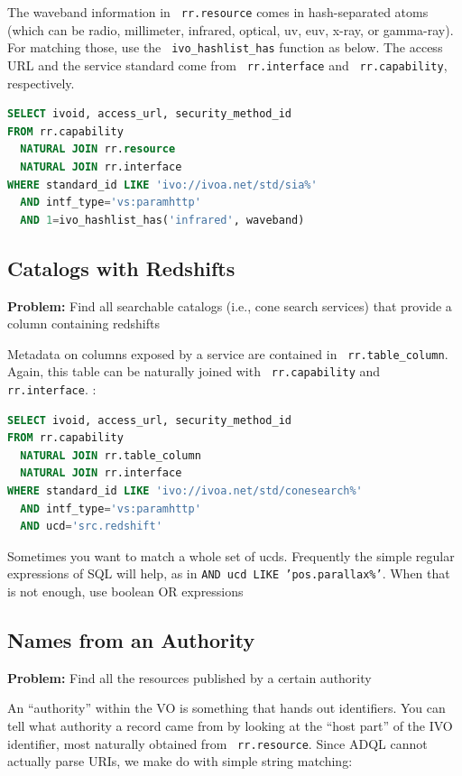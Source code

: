 \documentclass[11pt,a4paper]{ivoa}
\newcommand{\rtent}[1]{\texttt{\color{rtcolor} #1}}
\begin{document}
The waveband information in 
\rtent{rr.resource} 
comes in hash-separated atoms (which can be
radio, millimeter, infrared, optical, uv, euv, x-ray, or gamma-ray).
For matching those, use the \rtent{ivo\_hashlist\_has} function as
below.  The access URL and the service standard come from 
\rtent{rr.interface} and 
\rtent{rr.capability}, respectively.


\begin{lstlisting}[language=SQL,flexiblecolumns=true]
SELECT ivoid, access_url, security_method_id
FROM rr.capability 
  NATURAL JOIN rr.resource
  NATURAL JOIN rr.interface
WHERE standard_id LIKE 'ivo://ivoa.net/std/sia%'
  AND intf_type='vs:paramhttp'
  AND 1=ivo_hashlist_has('infrared', waveband)
\end{lstlisting}

\subsection{Catalogs with Redshifts}
\textbf{Problem:} Find all searchable catalogs (i.e., cone search
services) that provide a column containing redshifts

Metadata on columns exposed by a service are contained in 
\rtent{rr.table\_column}.  Again, this table can be
naturally joined with 
\rtent{rr.capability} and 
\rtent{rr.interface}.
:
\begin{lstlisting}[language=SQL,flexiblecolumns=true]
SELECT ivoid, access_url, security_method_id
FROM rr.capability 
  NATURAL JOIN rr.table_column
  NATURAL JOIN rr.interface 
WHERE standard_id LIKE 'ivo://ivoa.net/std/conesearch%'
  AND intf_type='vs:paramhttp'
  AND ucd='src.redshift'
\end{lstlisting}

Sometimes you want to match a whole set of ucds.  Frequently the
simple regular expressions of SQL will help, as in 
\texttt{AND ucd LIKE 'pos.parallax\%'}.  When that is not enough, 
use boolean OR expressions 

\subsection{Names from an Authority}

\textbf{Problem:} Find all the resources published by a certain
authority

An ``authority'' within the VO is something that hands out identifiers.
You can tell what authority a record came from by looking at the ``host
part'' of the IVO identifier, most naturally obtained from 
\rtent{rr.resource}.  Since ADQL cannot actually parse
URIs, we make do with simple string matching:
\end{document}
